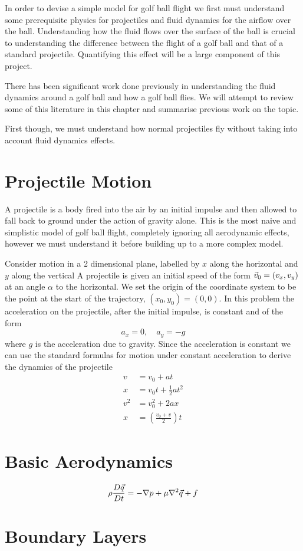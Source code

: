 In order to devise a simple model for golf ball flight we first must understand some
prerequisite physics for projectiles and fluid dynamics for the airflow over the ball. Understanding
how the fluid flows over the surface of the ball is crucial to understanding the difference between
the flight of a golf ball and that of a standard projectile. Quantifying this effect will be a large
component of this project.

There has been significant work done previously in understanding the fluid dynamics around a golf ball
and how a golf ball flies. We will attempt to review some of this literature in this chapter and summarise
previous work on the topic.

First though, we must understand how normal projectiles fly without taking into account fluid dynamics effects.
\section{Projectile Motion}
A projectile is a body fired into the air by an initial impulse and then allowed to fall back to ground under the
action of gravity alone. This is the most naive and simplistic model of golf ball flight, completely
ignoring all aerodynamic effects, however we must understand it before building up to a more
complex model.

Consider motion in a 2 dimensional plane, labelled by $x$ along the horizontal and $y$ along the vertical
A projectile is given an initial speed of the form $\vec{v}_0 = (v_x, v_y)$ at an angle $\alpha$ to
the horizontal. We set the origin of the coordinate system to be the point at the start of the
trajectory, $(x_0, y_0) = (0,0)$. In this problem the acceleration on the projectile, after the initial
impulse, is constant and of the form
\begin{equation}
a_x = 0, \quad a_y = -g
\end{equation}
where $g$ is the acceleration due to gravity. Since the acceleration is constant we can use
the standard formulas for motion under constant acceleration to derive the dynamics of the
projectile \citet{yandf}
\begin{subequations} \label{suvat}
\begin{align}
v &= v_0 + at \\
x &= v_0 t + \frac{1}{2} a t^2 \\
v^2 &= v_0^2 + 2ax \\
x &= \left(\frac{v_0 + v}{2}\right) t
\end{align}
\end{subequations}
\section{Basic Aerodynamics}\begin{equation}
\rho \frac{D\vec{q}}{Dt} = - \nabla p + \mu \nabla^2 \vec{q} + f
\end{equation}

\section{Boundary Layers}

